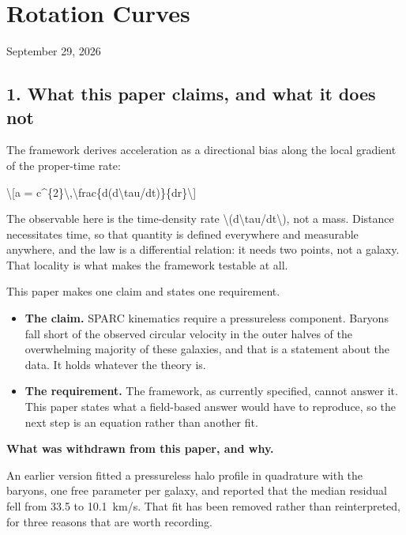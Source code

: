 \documentclass[
  10pt,
]{article}
\author{}
\date{}
\providecommand{\tightlist}{%
  \setlength{\itemsep}{0pt}\setlength{\parskip}{0pt}}
\begin{document}
\hypertarget{rotation-curves}{%
\section{Rotation Curves}\label{rotation-curves}}

September 29, 2026

\hypertarget{what-this-paper-claims-and-what-it-does-not}{%
\subsection{1. What this paper claims, and what it does
not}\label{what-this-paper-claims-and-what-it-does-not}}

The framework derives acceleration as a directional bias along the local
gradient of the proper-time rate:

\textbackslash{[}a =
c\^{}\{2\}\textbackslash,\textbackslash frac\{d(d\textbackslash tau/dt)\}\{dr\}\textbackslash{]}

The observable here is the time-density rate
\textbackslash(d\textbackslash tau/dt\textbackslash), not a mass.
Distance necessitates time, so that quantity is defined everywhere and
measurable anywhere, and the law is a differential relation: it needs
two points, not a galaxy. That locality is what makes the framework
testable at all.

This paper makes one claim and states one requirement.

\begin{itemize}
\tightlist
\item
  \textbf{The claim.} SPARC kinematics require a pressureless component.
  Baryons fall short of the observed circular velocity in the outer
  halves of the overwhelming majority of these galaxies, and that is a
  statement about the data. It holds whatever the theory is.
\item
  \textbf{The requirement.} The framework, as currently specified,
  cannot answer it. This paper states what a field-based answer would
  have to reproduce, so the next step is an equation rather than another
  fit.
\end{itemize}

\textbf{What was withdrawn from this paper, and why.}

An earlier version fitted a pressureless halo profile in quadrature with
the baryons, one free parameter per galaxy, and reported that the median
residual fell from 33.5 to 10.1~km/s. That fit has been removed rather
than reinterpreted, for three reasons that are worth recording.
\end{document}
